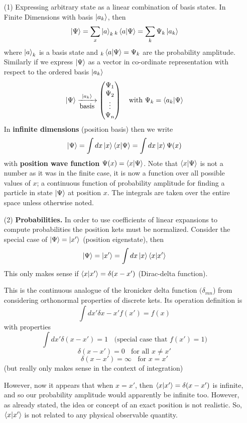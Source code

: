 \documentclass[english, 11pt]{article}
\begin{document}
    \begin{itemize}
      \item[(1)] Expressing arbitrary state as a linear combination of basis states. In Finite Dimensions with basis $\left|a_k\right\rangle$, then
      \[ \kpsi = \sum_x \ket{a}_k{}_k\braket{a}{\Psi} = \sum_k \Psi_k \ket{a_k} \]
      where $\left|a\right\rangle_k$ is a basis state and ${}_k\braket{a}{\Psi} = \Psi_k$ are the probability amplitude. Similarly if we express $\left|\Psi\right\rangle$ as a vector in co-ordinate representation with respect to the ordered basis $\left|a_k\right\rangle$
      \[ \kpsi  \xrightarrow[\mbox{basis}]{\ket{a_k}} \mtx{\Psi_1\\\Psi_2\\\vdots\\\Psi_n} \ \ \ \mbox{with } \Psi_k = \braket{a_k}{\Psi} \]
      In \textbf{infinite dimensions} (position basis) then we write
      \[ \kpsi = \int dx \kx \braket{x}{\Psi} = \int dx \kx\Psi(x) \]
      with \textbf{position wave function} $\Psi(x) = \braket{x}{\Psi}$. Note that $\braket{x}{\Psi}$ is not a number as it was in the finite case, it is now a function over all possible values of $x$; a continuous function of probability amplitude for finding a particle in state $\left|\Psi\right\rangle$ at position $x$. The integrals are taken over the entire space unless otherwise noted.

      \item[(2)] \textbf{Probabilities.} In order to use coefficients of linear expansions to compute probabilities the position kets must be normalized. Consider the special case of $\left|\Psi\right\rangle = \left|x'\right\rangle$ (position eigenstate), then
      \[ \kpsi = \ket{x'} = \int dx \kx\braket{x}{x'} \]
      This only makes sense if $\braket{x}{x'} = \delta(x-x')$ (Dirac-delta function).
      \begin{defn}\label{Dirac-delta function}
        This is the continuous analogue of the kronicker delta function $(\delta_{mn}$) from considering orthonormal properties of discrete kets. Its operation definition is
        \[ \int dx' \delta{x-x'}f(x') = f(x) \]
        with properties
        \[ \int dx' \delta(x-x') = 1 \ \ \ \ \mbox{(special case that $f(x') = 1$)} \]
        \[ \delta(x-x') = 0 \ \ \ \ \mbox{for all $x \not = x'$} \]
        \[ \delta(x-x') = \infty \ \ \ \ \mbox{for $x = x'$} \]
        (but really only makes sense in the context of integration)
      \end{defn}
      However, now it appears that when $x = x'$, then $\braket{x}{x'} = \delta(x-x')$ is infinite, and so our probability amplitude would apparently be infinite too. However, as already stated, the idea or concept of an exact position is not realistic. So, $\braket{x}{x'}$ is not related to any physical observable quantity.
      \newline


\end{itemize}
\end{document}
